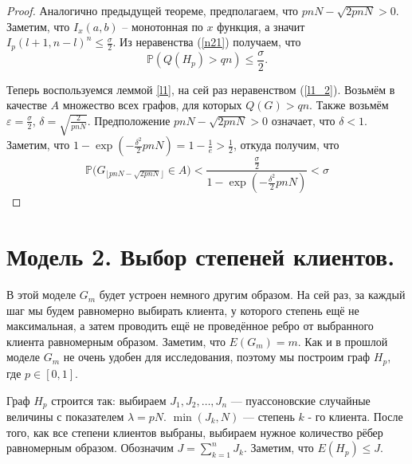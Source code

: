 \documentclass{matmex-diploma-custom}
\newcommand{\PRob}{\mathbb P}
\newcommand{\leqs}{\leqslant}
\newcommand{\eps}{\varepsilon}
\theoremstyle{named}
\begin{document}
\begin{proof}
Аналогично предыдущей теореме, предполагаем, что $pnN - \sqrt{2pnN} > 0$.
Заметим, что $I_x(a,b)$ -- монотонная по $x$ функция, а значит $I_p(l+1, n-l)^n \leqs \frac\sigma{2}$. 
Из неравенства (\ref{n21}) получаем, что
\begin{equation}
\PRob(Q(H_p) > qn) \leqs \frac\sigma{2}.
\end{equation}

Теперь воспользуемся леммой \ref{l1}, на сей раз неравенством (\ref{l1_2}).
Возьмём в качестве $A$ множество всех графов, для которых $Q(G) > qn$.
Также возьмём $\eps = \frac\sigma{2}$, $\delta = \sqrt{\frac{2}{pnN}}$.
Предположение $pnN - \sqrt{2pnN} > 0$ означает, что $\delta < 1$.
Заметим, что $1 - \exp\left(-\frac{\delta^2}{2}pnN\right) = 1 - \frac{1}{e} > \frac{1}{2}$, откуда получим, что
\begin{equation}
\PRob\big(G_{\lfloor pnN - \sqrt{2pnN} \rfloor} \in A\big) 
	< 
\frac{\frac\sigma{2}}{1 - \exp\left(-\frac{\delta^2}{2}pnN\right)}
	<
\sigma
\end{equation}
\end{proof}

\section*{Модель 2. Выбор степеней клиентов.}
В этой моделе $G_m$ будет устроен немного другим образом. На сей раз, за каждый шаг мы будем равномерно выбирать клиента, 
у которого степень ещё не максимальная, а затем проводить ещё не проведённое ребро от выбранного клиента равномерным образом.
Заметим, что $E(G_m) = m$. Как и в прошлой моделе $G_m$ не очень удобен для исследования, поэтому мы построим граф $H_p$, где $p \in [0,1]$.

Граф $H_p$ строится так: выбираем $J_1, J_2, \dots, J_n$ --- пуассоновские случайные величины с показателем $\lambda = pN$.
$\min(J_k, N)$ --- степень $k$ - го клиента. После того, как все степени клиентов выбраны, 
выбираем нужное количество рёбер равномерным образом. Обозначим $J = \sum\limits_{k=1}^n J_k$. Заметим, что $E(H_p) \leqs J$.
\end{document}
